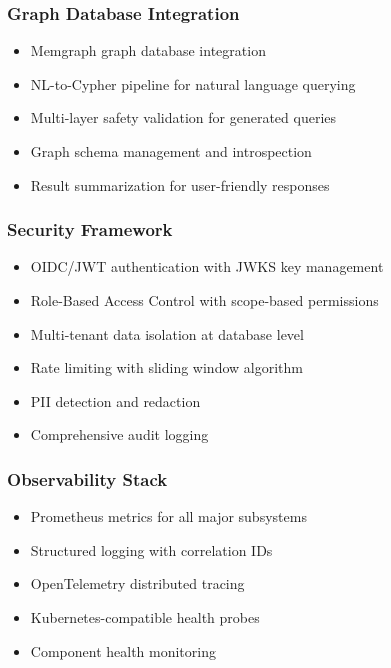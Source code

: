 \documentclass[a4paper,twoside]{sapthesis}
\begin{document}
\subsubsection{Graph Database Integration}

\begin{itemize}
    \item Memgraph graph database integration
    \item NL-to-Cypher pipeline for natural language querying
    \item Multi-layer safety validation for generated queries
    \item Graph schema management and introspection
    \item Result summarization for user-friendly responses
\end{itemize}

\subsubsection{Security Framework}

\begin{itemize}
    \item OIDC/JWT authentication with JWKS key management
    \item Role-Based Access Control with scope-based permissions
    \item Multi-tenant data isolation at database level
    \item Rate limiting with sliding window algorithm
    \item PII detection and redaction
    \item Comprehensive audit logging
\end{itemize}

\subsubsection{Observability Stack}

\begin{itemize}
    \item Prometheus metrics for all major subsystems
    \item Structured logging with correlation IDs
    \item OpenTelemetry distributed tracing
    \item Kubernetes-compatible health probes
    \item Component health monitoring
\end{itemize}
\end{document}

